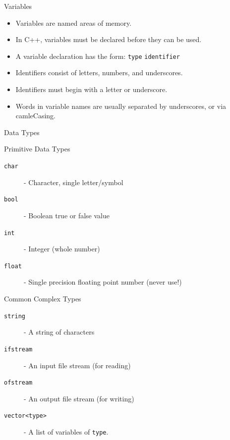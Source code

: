 \documentclass[handout]{beamer}
\begin{document}
\begin{frame}{Variables}
    \begin{itemize}
        \item Variables are named areas of memory.
        \item In C++, variables must be declared before they can be
            used.
        \item A variable declaration has the form:
            \newline\texttt{type} \texttt{identifier}
        \item Identifiers consist of letters, numbers, and
            underscores.
        \item Identifiers must begin with a letter or underscore.
        \item Words in variable names are usually separated by
            underscores, or via camleCasing.
    \end{itemize}
\end{frame}

\begin{frame}{Data Types}
    \begin{block}{Primitive Data Types}
        \begin{description}
            \item[\texttt{char}] - Character, single letter/symbol
            \item[\texttt{bool}] - Boolean true or false value
            \item[\texttt{int}] - Integer (whole number)
            \item[\texttt{float}] - Single precision floating point
                number (never use!)
        \end{description}
    \end{block}

    \begin{block}{Common Complex Types}
        \begin{description}
            \item[\texttt{string}] - A string of characters
            \item[\texttt{ifstream}] - An input file stream (for reading)
            \item[\texttt{ofstream}] - An output file stream (for
                writing)
            \item[\texttt{vector<type>}] - A list of variables of
                \texttt{type}.
        \end{description}
    \end{block}
\end{frame}
\end{document}
